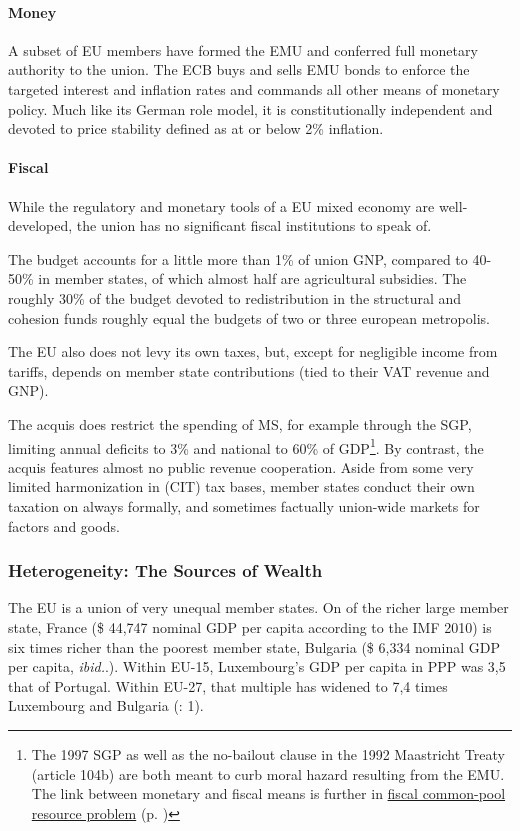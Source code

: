 \documentclass[11pt,a4paper,oneside,openright]{article}
\begin{document}
\paragraph{Money} A subset of \gls{EU} members have formed the \gls{EMU} and conferred full monetary authority to the union. The \gls{ECB} buys and sells \gls{EMU} bonds to enforce the targeted interest and inflation rates and commands all other means of monetary policy. Much like its German role model, it is constitutionally independent and devoted to price stability defined as at or below 2\% inflation.

\paragraph{Fiscal} While the regulatory and monetary tools of a \gls{EU} mixed economy are well-developed, the union has no significant fiscal institutions to speak of. 


The budget accounts for a little more than 1\% of union \gls{GNP}, compared to 40-50\% in member states, of which almost half are agricultural subsidies. The roughly 30\% of the budget devoted to redistribution in the structural and cohesion funds roughly equal the budgets of two or three european metropolis. %

The \gls{EU} also does not levy its own taxes, but, except for negligible income from tariffs, depends on member state contributions (tied to their \gls{VAT} revenue and \gls{GNP}). 

The acquis does restrict the spending of \gls{MS}, for example through the \gls{SGP}, limiting annual deficits to 3\% and national to 60\% of \gls{GDP}\footnote{
	The 1997 \gls{SGP} as well as the no-bailout clause in the 1992 Maastricht Treaty (article 104b) are both meant to curb moral hazard resulting from the \gls{EMU}. The link between monetary and fiscal means is further in \hyperref[sec:fiscal_CPR]{fiscal common-pool resource problem} (p. \pageref{sec:fiscal_CPR})}.%
By contrast, the acquis features almost no public revenue cooperation. Aside from some very limited harmonization in (\gls{CIT}) tax bases, member states conduct their own taxation on always formally, and sometimes factually union-wide markets for factors and goods.

\subsubsection[Heterogeneity]{Heterogeneity: The Sources of Wealth} \label{sec:sources_of_wealth} The \gls{EU} is a union of very unequal member states. On of the richer large member state, France (\$ 44,747 nominal \gls{GDP} per capita according to the IMF 2010) is six times richer than the poorest member state, Bulgaria (\$ 6,334 nominal \gls{GDP} per capita, \emph{ibid.}.). Within \gls{EU}-15, Luxembourg's \gls{GDP} per capita in \gls{PPP} was 3,5 that of Portugal. Within \gls{EU}-27, that multiple has widened to 7,4 times Luxembourg and Bulgaria (\citealt{Alber2008}: 1). %
\end{document}
